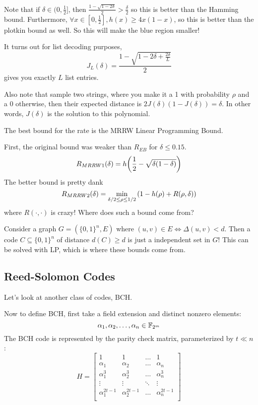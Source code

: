 Note that if $\delta \in (0 , \frac{1}{2}]$, then $\frac{1 - \sqrt{1 - 2\delta}}{2} > \frac{\delta}{2}$ so
this is better than the Hamming bound. Furthermore, $\forall x \in [0, \frac{1}{2}], h(x) \geq 4x(1- x)$,
so this is better than the plotkin bound as well. So this will make the blue region smaller!

It turns out for list decoding purposes,
\[ J_L(\delta) = \frac{1 - \sqrt{1 - 2\delta + \frac{2\delta}{L}}}{2} \]
gives you exactly $L$ list entries.

Also note that 
sample two strings, where you make it a 1 with probability $\rho$ and a 0 otherwise,
then their expected distance is $2 J(\delta)(1 - J(\delta)) = \delta$. In other words, $J(\delta)$
is the solution to this polynomial.

The best bound for the rate is the MRRW Linear Programming Bound.

First, the original bound was weaker than $R_{EB}$ for $\delta \leq 0.15$.
\[ R_{MRRW1} (\delta) = h\qty(\frac{1}{2} - \sqrt{\delta(1 - \delta)}) \]
The better bound is pretty dank
\[ R_{MRRW2}  (\delta) = \min_{\delta/2 \leq \rho \leq 1/2}\qty(1 - h(\rho) + R(\rho, \delta)) \]
where $R(\cdot, \cdot)$ is crazy! Where does such a bound come from? 

Consider a graph $G = (\{0, 1\}^n, E)$ where $(u, v) \in E \iff \Delta(u, v) < d$.
Then a code $C \subseteq \{0, 1\}^n$ of distance $d(C) \geq d$ is just a independent set in $G$!
This can be solved with LP, which is where these bounds come from.

\subsection{Reed-Solomon Codes}
Let's look at another class of codes, BCH.

Now to define BCH, first take a field extension and distinct nonzero elements:
\[ \alpha_1, \alpha_2, \dots, \alpha_n \in \operatorname{\mathbb{F}}_{2^m} \]
The BCH code is represented by the parity check matrix, parameterized by $t \ll n$:
\[ H = \begin{bmatrix}
    1 & 1 & \dots & 1 \\
    \alpha_1 & \alpha_2 & \dots & \alpha_n \\
    \alpha_1^3 & \alpha_2^3 & \dots & \alpha_n^3 \\
    \vdots & \vdots & \ddots & \vdots \\
    \alpha_1^{2t-1} & \alpha_2^{2t - 1} & \dots & \alpha_n^{2t - 1} \\
\end{bmatrix} \]

